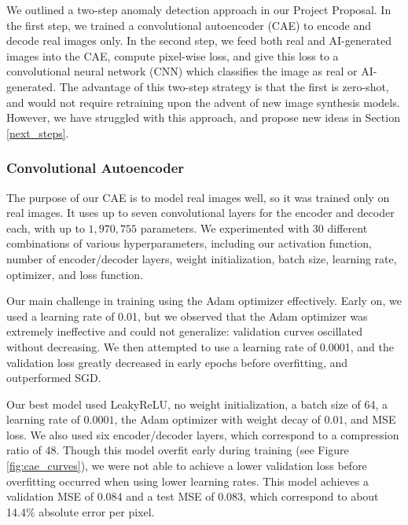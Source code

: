 \documentclass{article} %
\begin{document}
We outlined a two-step anomaly detection approach in our Project Proposal. In the first step, we trained a convolutional autoencoder (CAE) to encode and decode real images only. In the second step, we feed both real and AI-generated images into the CAE, compute pixel-wise loss, and give this loss to a convolutional neural network (CNN) which classifies the image as real or AI-generated. The advantage of this two-step strategy is that the first is zero-shot, and would not require retraining upon the advent of new image synthesis models. However, we have struggled with this approach, and propose new ideas in Section \ref{next_steps}.

\subsubsection{Convolutional Autoencoder}

The purpose of our CAE is to model real images well, so it was trained only on real images. It uses up to seven convolutional layers for the encoder and decoder each, with up to $1,970,755$ parameters. We experimented with 30 different combinations of various hyperparameters, including our activation function, number of encoder/decoder layers, weight initialization, batch size, learning rate, optimizer, and loss function.

Our main challenge in training using the Adam optimizer effectively. Early on, we used a learning rate of 0.01, but we observed that the Adam optimizer was extremely ineffective and could not generalize: validation curves oscillated without decreasing. We then attempted to use a learning rate of 0.0001, and the validation loss greatly decreased in early epochs before overfitting, and outperformed SGD.

Our best model used LeakyReLU, no weight initialization, a batch size of 64, a learning rate of $0.0001$, the Adam optimizer with weight decay of $0.01$, and MSE loss. We also used six encoder/decoder layers, which correspond to a compression ratio of 48. Though this model overfit early during training (see Figure \ref{fig:cae_curves}), we were not able to achieve a lower validation loss before overfitting occurred when using lower learning rates. This model achieves a validation MSE of 0.084 and a test MSE of 0.083, which correspond to about 14.4\% absolute error per pixel.
\end{document}
